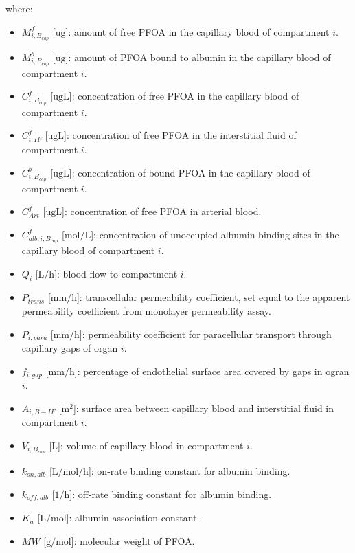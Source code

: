 \documentclass[preprint,12pt,authoryear]{elsarticle}
\begin{document}
\noindent
where:
\begin{itemize}
    \item $M_{i,B_{cap}}^f$ [$\text{ug}$]: amount of free PFOA in the capillary blood of compartment $i$.
    \item $M_{i,B_{cap}}^b$ [$\text{ug}$]: amount of PFOA bound to albumin in the capillary blood of compartment $i$.
    \item $C_{i,B_{cap}}^f$ [$\text{ug}\text{L}$]: concentration of free PFOA in the capillary blood of compartment $i$.
    \item $C_{i,IF}^f$ [$\text{ug}\text{L}$]: concentration of free PFOA in the interstitial fluid of compartment $i$.
    \item $C_{i,B_{cap}}^b$ [$\text{ug}\text{L}$]: concentration of bound PFOA in the capillary blood of compartment $i$.
    \item $C_{Art}^f$ [$\text{ug}\text{L}$]: concentration of free PFOA in arterial blood.
    \item $C_{alb,i,B_{cap}}^f$ [$\text{mol}/\text{L}$]: concentration of unoccupied albumin binding sites in the capillary blood of compartment $i$.
    \item $Q_i$ [$\text{L}/\text{h}$]: blood flow to compartment $i$.
    \item $P_{trans}$ [$\text{mm}/\text{h}$]: transcellular permeability coefficient, set equal to the apparent permeability coefficient from monolayer permeability assay.
    \item $P_{i,para}$ [$\text{mm}/\text{h}$]: permeability coefficient for paracellular transport through capillary gaps of organ $i$.
    \item $f_{i,gap}$ [$\text{mm}/\text{h}$]: percentage of endothelial surface area covered by gaps in ogran $i$.
    \item $A_{i,B-IF}$ [$\text{m}^2$]: surface area between capillary blood and interstitial fluid in compartment $i$.
    \item $V_{i,B_{cap}}$ [$\text{L}$]: volume of capillary blood in compartment $i$.
    \item $k_{on,alb}$ [$\text{L}/\text{mol}/\text{h}$]: on-rate binding constant for albumin binding.
    \item $k_{off,alb}$ [$1/\text{h}$]: off-rate binding constant for albumin binding.
    \item $K_a$ [$\text{L}/\text{mol}$]: albumin association constant.
    \item $MW$ [$\text{g}/\text{mol}$]: molecular weight of PFOA.
\end{itemize}
\end{document}
